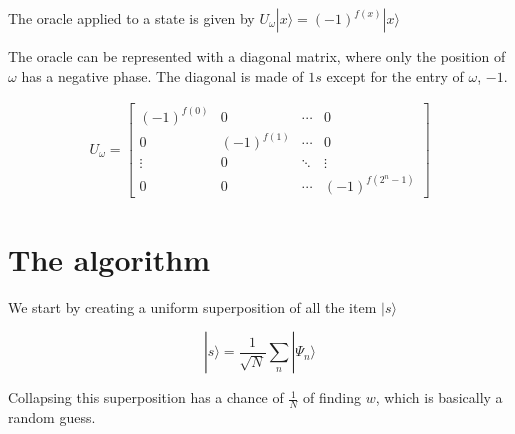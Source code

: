 \documentclass{article}
\begin{document}
The oracle applied to a state is given by \(U_\omega|x\rangle ={(-1)}^{f(x)}|x\rangle\)

The oracle can be represented with a diagonal matrix, where only the position of \(\omega\) has a negative phase.
The diagonal is made of \(1s\) except for the entry of \(\omega\), \(-1\).

\begin{align*}
    U_\omega=
    \begin{bmatrix}
        {(-1)}^{f(0)} & 0 & \cdots & 0 \\
        0 & {(-1)}^{f(1)} & \cdots & 0 \\
        \vdots & 0 & \ddots & \vdots \\
        0 & 0 & \cdots & {(-1)}^{f(2^n-1)}
    \end{bmatrix}
\end{align*}

\section{The algorithm}

We start by creating a uniform superposition of all the item \(|s\rangle\)

\[
    |s\rangle=\frac{1}{\sqrt{N}}\sum_{n}|\Psi_n\rangle
\]

Collapsing this superposition has a chance of \(\frac{1}{N}\) of finding \(w\), which is basically a random guess.
\end{document}
